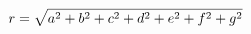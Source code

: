 \documentclass[a4paper, 12pt]{article}
\begin{document}
    \begin{equation*}
        r = 
        \sqrt{\foreach \x in {a, ..., g} { %
            \ifthenelse{\equal{\x}{a}}{}{+} %
            \x^2 %
        }}
    \end{equation*}
\end{document}
